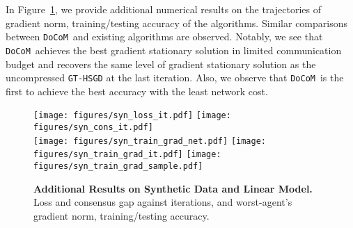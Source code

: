 \documentclass[10pt]{article} %
\theoremstyle{plain}
\theoremstyle{definition}
\theoremstyle{remark}
\newcommand{\aname}{{\tt DoCoM}}
\begin{document}
In Figure~\ref{fig:syn_app}, we provide additional numerical results on the trajectories of gradient norm, training/testing accuracy of the algorithms. Similar comparisons between \aname~and existing algorithms are observed. Notably, we see that \aname~achieves the best gradient stationary solution in limited communication budget and recovers the same level of gradient stationary solution as the uncompressed {\tt GT-HSGD} at the last iteration. Also, we observe that \aname~is the first to achieve the best accuracy with the least network cost.

\begin{figure}[hbtp]
\centering
    \texttt{[image: figures/syn\_loss\_it.pdf]}
    \texttt{[image: figures/syn\_cons\_it.pdf]}\\
    \texttt{[image: figures/syn\_train\_grad\_net.pdf]}
    \texttt{[image: figures/syn\_train\_grad\_it.pdf]}
    \texttt{[image: figures/syn\_train\_grad\_sample.pdf]}\\
    \caption{\textbf{Additional Results on Synthetic Data and Linear Model.} Loss and consensus gap against iterations, and worst-agent's gradient norm, training/testing accuracy.}\vspace{-.2cm} \label{fig:syn_app}
\end{figure}
\end{document}
